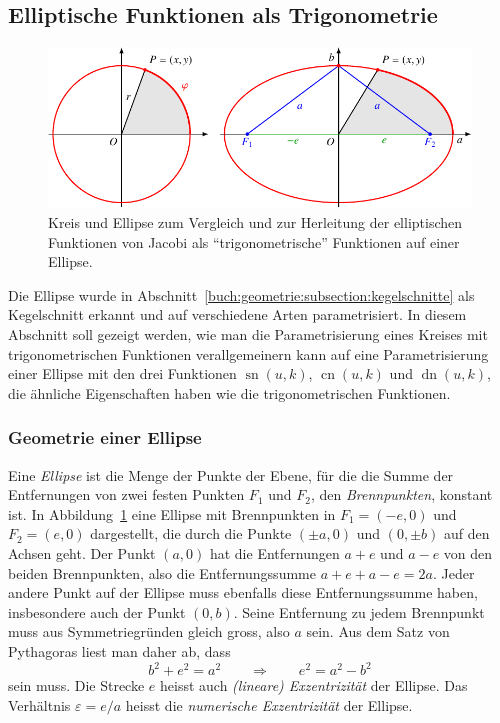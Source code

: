 %
%
%

%
%
\subsection{Elliptische Funktionen als Trigonometrie}
\begin{figure}
\centering
\includegraphics{chapters/110-elliptisch/images/ellipse.pdf}
\caption{Kreis und Ellipse zum Vergleich und zur Herleitung der 
elliptischen Funktionen von Jacobi als ``trigonometrische'' Funktionen
auf einer Ellipse.
\label{buch:elliptisch:fig:ellipse}}
\end{figure}
Die Ellipse wurde in Abschnitt~\ref{buch:geometrie:subsection:kegelschnitte}
als Kegelschnitt erkannt und auf verschiedene Arten parametrisiert.
In diesem Abschnitt soll gezeigt werden, wie man die Parametrisierung
eines Kreises mit trigonometrischen Funktionen verallgemeinern kann
auf eine Parametrisierung einer Ellipse mit den drei
Funktionen $\operatorname{sn}(u,k)$,
$\operatorname{cn}(u,k)$ und $\operatorname{dn}(u,k)$,
die ähnliche Eigenschaften haben wie die trigonometrischen Funktionen.

%
%
\subsubsection{Geometrie einer Ellipse}
Eine {\em Ellipse} ist die Menge der Punkte der Ebene, für die die Summe
%
der Entfernungen von zwei festen Punkten $F_1$ und $F_2$,
den {\em Brennpunkten}, konstant ist.
%
In Abbildung~\ref{buch:elliptisch:fig:ellipse} eine Ellipse
mit Brennpunkten in $F_1=(-e,0)$ und $F_2=(e,0)$ dargestellt,
die durch die Punkte $(\pm a,0)$ und $(0,\pm b)$ auf den Achsen geht.
Der Punkt $(a,0)$ hat die Entfernungen $a+e$ und $a-e$ von den beiden
Brennpunkten, also die Entfernungssumme $a+e+a-e=2a$.
Jeder andere Punkt auf der Ellipse muss ebenfalls diese Entfernungssumme
haben, insbesondere auch der Punkt $(0,b)$.
Seine Entfernung zu jedem Brennpunkt muss aus Symmetriegründen gleich gross,
also $a$ sein.
Aus dem Satz von Pythagoras liest man daher ab, dass
\[
b^2+e^2=a^2
\qquad\Rightarrow\qquad
e^2 = a^2-b^2
\]
sein muss.
Die Strecke $e$ heisst auch {\em (lineare) Exzentrizität} der Ellipse.
Das Verhältnis $\varepsilon= e/a$  heisst die {\em numerische Exzentrizität}
der Ellipse.

